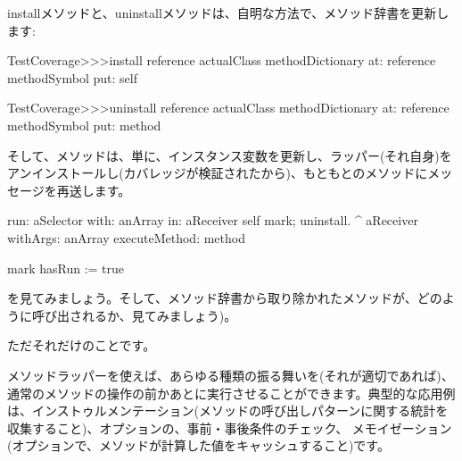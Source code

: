 \documentclass[a4paper,10pt,twoside]{book}
\begin{document}
installメソッドと、uninstallメソッドは、自明な方法で、メソッド辞書を更新します:
\begin{code}{}
TestCoverage>>>install
	reference actualClass methodDictionary
		at: reference methodSymbol
		put: self

TestCoverage>>>uninstall
	reference actualClass methodDictionary
		at: reference methodSymbol
		put: method
\end{code}
\noindent
そして、メソッドは、単に、インスタンス変数を更新し、ラッパー(それ自身)をアンインストールし(カバレッジが検証されたから)、もともとのメソッドにメッセージを再送します。%
\begin{code}{}
run: aSelector with: anArray in: aReceiver
	self mark; uninstall.
	^ aReceiver withArgs: anArray executeMethod: method

mark
	hasRun := true
\end{code}
を見てみましょう。そして、メソッド辞書から取り除かれたメソッドが、どのように呼び出されるか、見てみましょう)。

ただそれだけのことです。

メソッドラッパーを使えば、あらゆる種類の振る舞いを(それが適切であれば)、通常のメソッドの操作の前かあとに実行させることができます。典型的な応用例は、インストゥルメンテーション(メソッドの呼び出しパターンに関する統計を収集すること)、オプションの、事前・事後条件のチェック、 メモイゼーション(オプションで、メソッドが計算した値をキャッシュすること)です。

\end{document}
